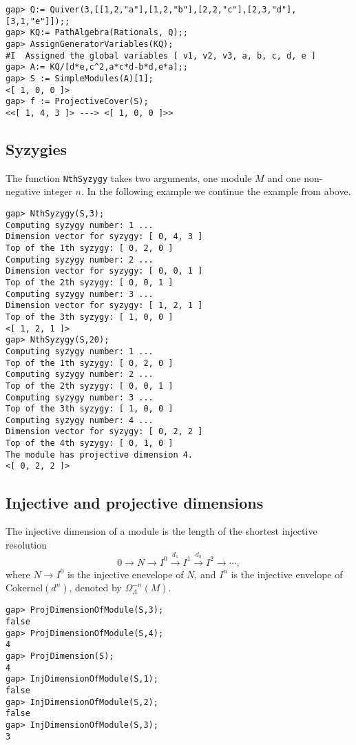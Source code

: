 \documentclass{amsart}
\theoremstyle{definition}
\newcommand{\code}[1]{\texttt{#1}}
\theoremstyle{theoretic}
\begin{document}
\begin{verbatim}
gap> Q:= Quiver(3,[[1,2,"a"],[1,2,"b"],[2,2,"c"],[2,3,"d"],
[3,1,"e"]]);;
gap> KQ:= PathAlgebra(Rationals, Q);;
gap> AssignGeneratorVariables(KQ);
#I  Assigned the global variables [ v1, v2, v3, a, b, c, d, e ]
gap> A:= KQ/[d*e,c^2,a*c*d-b*d,e*a];;
gap> S := SimpleModules(A)[1];
<[ 1, 0, 0 ]>
gap> f := ProjectiveCover(S);
<<[ 1, 4, 3 ]> ---> <[ 1, 0, 0 ]>>
\end{verbatim}

\subsection{Syzygies}
The function \code{NthSyzygy} takes two arguments, one module $M$ and
one non-negative integer $n$.  In the following example we continue
the example from above. 
\begin{verbatim}
gap> NthSyzygy(S,3);
Computing syzygy number: 1 ...
Dimension vector for syzygy: [ 0, 4, 3 ]
Top of the 1th syzygy: [ 0, 2, 0 ]
Computing syzygy number: 2 ...
Dimension vector for syzygy: [ 0, 0, 1 ]
Top of the 2th syzygy: [ 0, 0, 1 ]
Computing syzygy number: 3 ...
Dimension vector for syzygy: [ 1, 2, 1 ]
Top of the 3th syzygy: [ 1, 0, 0 ]
<[ 1, 2, 1 ]>
gap> NthSyzygy(S,20);
Computing syzygy number: 1 ...
Top of the 1th syzygy: [ 0, 2, 0 ]
Computing syzygy number: 2 ...
Top of the 2th syzygy: [ 0, 0, 1 ]
Computing syzygy number: 3 ...
Top of the 3th syzygy: [ 1, 0, 0 ]
Computing syzygy number: 4 ...
Dimension vector for syzygy: [ 0, 2, 2 ]
Top of the 4th syzygy: [ 0, 1, 0 ]
The module has projective dimension 4.
<[ 0, 2, 2 ]>
\end{verbatim}

\subsection{Injective and projective dimensions}
The injective dimension of a module is the length of the shortest
injective resolution
\[0\to N\to I^0\xrightarrow{d_1} I^1\xrightarrow{d_2} I^2\to \cdots, \]
where $N\to I^0$ is the injective enevelope of $N$, and $I^{n}$ is the
injective envelope of $\textrm{Cokernel}(d^n)$, denoted by
$\Omega^{-n}_\Lambda(M)$. 
\begin{verbatim}
gap> ProjDimensionOfModule(S,3);
false
gap> ProjDimensionOfModule(S,4);
4
gap> ProjDimension(S);
4
gap> InjDimensionOfModule(S,1); 
false
gap> InjDimensionOfModule(S,2);
false
gap> InjDimensionOfModule(S,3);
3
\end{verbatim}
\end{document}

